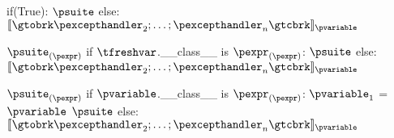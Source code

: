\documentclass{article}
\begin{document}
\begin{mathpar}
\end{mathpar}

\newsavebox{\exnBox}
\begin{lrbox}{\exnBox}
\begin{python}
if(True):
  $\psuite$
else:
  $\meaningof{\gtobrk \pexcepthandler_2; \ldots; \pexcepthandler_n \gtcbrk}_{\pvariable}$
\end{python}
\end{lrbox}

\begin{mathpar}
\end{mathpar}

\newsavebox{\exnBoxTwo}
\begin{lrbox}{\exnBoxTwo}
\begin{python}
$\psuite_{(\pexpr)}$
if $\tfreshvar$.__class__ is $\pexpr_{(\pexpr)}$:
  $\psuite$
else:
  $\meaningof{\gtobrk \pexcepthandler_2; \ldots; \pexcepthandler_n \gtcbrk}_{\pvariable}$
\end{python}
\end{lrbox}

\begin{mathpar}
\end{mathpar}

\newsavebox{\exnBoxThree}
\begin{lrbox}{\exnBoxThree}
\begin{python}
$\psuite_{(\pexpr)}$
if $\pvariable$.__class__ is $\pexpr_{(\pexpr)}$:
  $\pvariable_1$ = $\pvariable$
  $\psuite$
else:
  $\meaningof{\gtobrk \pexcepthandler_2; \ldots; \pexcepthandler_n \gtcbrk}_{\pvariable}$
\end{python}
\end{lrbox}
\end{document}
